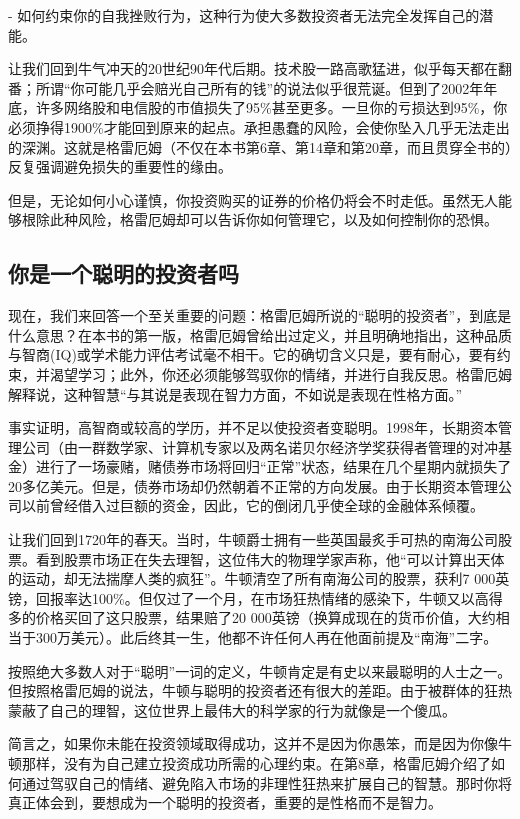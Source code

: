 \documentclass[12pt,oneside]{book}
\begin{document}
- 如何约束你的自我挫败行为，这种行为使大多数投资者无法完全发挥自己的潜能。

让我们回到牛气冲天的20世纪90年代后期。技术股一路高歌猛进，似乎每天都在翻番；所谓“你可能几乎会赔光自己所有的钱”的说法似乎很荒诞。但到了2002年年底，许多网络股和电信股的市值损失了95\%甚至更多。一旦你的亏损达到95\%，你必须挣得1900\%才能回到原来的起点。承担愚蠢的风险，会使你坠入几乎无法走出的深渊。这就是格雷厄姆（不仅在本书第6章、第14章和第20章，而且贯穿全书的）反复强调避免损失的重要性的缘由。

但是，无论如何小心谨慎，你投资购买的证券的价格仍将会不时走低。虽然无人能够根除此种风险，格雷厄姆却可以告诉你如何管理它，以及如何控制你的恐惧。

\subsection{你是一个聪明的投资者吗}
现在，我们来回答一个至关重要的问题：格雷厄姆所说的“聪明的投资者”，到底是什么意思？在本书的第一版，格雷厄姆曾给出过定义，并且明确地指出，这种品质与智商(IQ)或学术能力评估考试毫不相干。它的确切含义只是，要有耐心，要有约束，并渴望学习；此外，你还必须能够驾驭你的情绪，并进行自我反思。格雷厄姆解释说，这种智慧“与其说是表现在智力方面，不如说是表现在性格方面。”

事实证明，高智商或较高的学历，并不足以使投资者变聪明。1998年，长期资本管理公司（由一群数学家、计算机专家以及两名诺贝尔经济学奖获得者管理的对冲基金）进行了一场豪赌，赌债券市场将回归“正常”状态，结果在几个星期内就损失了20多亿美元。但是，债券市场却仍然朝着不正常的方向发展。由于长期资本管理公司以前曾经借入过巨额的资金，因此，它的倒闭几乎使全球的金融体系倾覆。

让我们回到1720年的春天。当时，牛顿爵士拥有一些英国最炙手可热的南海公司股票。看到股票市场正在失去理智，这位伟大的物理学家声称，他“可以计算出天体的运动，却无法揣摩人类的疯狂”。牛顿清空了所有南海公司的股票，获利7 000英镑，回报率达100\%。但仅过了一个月，在市场狂热情绪的感染下，牛顿又以高得多的价格买回了这只股票，结果赔了20 000英镑（换算成现在的货币价值，大约相当于300万美元）。此后终其一生，他都不许任何人再在他面前提及“南海”二字。

按照绝大多数人对于“聪明”一词的定义，牛顿肯定是有史以来最聪明的人士之一。但按照格雷厄姆的说法，牛顿与聪明的投资者还有很大的差距。由于被群体的狂热蒙蔽了自己的理智，这位世界上最伟大的科学家的行为就像是一个傻瓜。

简言之，如果你未能在投资领域取得成功，这并不是因为你愚笨，而是因为你像牛顿那样，没有为自己建立投资成功所需的心理约束。在第8章，格雷厄姆介绍了如何通过驾驭自己的情绪、避免陷入市场的非理性狂热来扩展自己的智慧。那时你将真正体会到，要想成为一个聪明的投资者，重要的是性格而不是智力。
\end{document}

